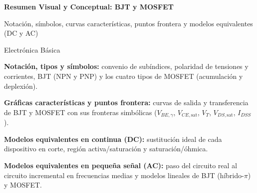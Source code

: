 \documentclass[11pt,a4paper]{article}
\begin{document}
	\begin{tcolorbox}[
		enhanced, colback=mainblue, colframe=mainblue, arc=4pt,
		left=14pt, right=14pt, top=14pt, bottom=14pt, boxrule=0pt,
		borderline south={3pt}{0pt}{goldline}
		]
		\centering\color{white}
		{\Huge\bfseries Resumen Visual y Conceptual: BJT y MOSFET\par}
		\vspace{0.5em}
		{\Large Notación, símbolos, curvas características, puntos frontera y modelos equivalentes (DC y AC)\par}
		\vspace{0.7em}
		{\normalsize Electrónica Básica \par}
	\end{tcolorbox}

	\vspace{1.0em}

	\begin{tcolorbox}[notebox, title={Cómo está organizado este resumen}, top=12pt]
		\begin{description}[leftmargin=!, labelwidth=2.6cm, itemsep=0.35em]
			\item[Sección 1] \textbf{Notación, tipos y símbolos:} convenio de subíndices, polaridad de tensiones y corrientes, BJT (NPN y PNP) y los cuatro tipos de MOSFET (acumulación y deplexión).
			\item[Sección 2] \textbf{Gráficas características y puntos frontera:} curvas de salida y transferencia de BJT y MOSFET con sus fronteras simbólicas ($V_{BE,\gamma}$, $V_{CE,\mathrm{sat}}$, $V_T$, $V_{DS,\mathrm{sat}}$, $I_{DSS}$).
			\item[Sección 3] \textbf{Modelos equivalentes en continua (DC):} sustitución ideal de cada dispositivo en corte, región activa/saturación y saturación/óhmica.
			\item[Sección 4] \textbf{Modelos equivalentes en pequeña señal (AC):} paso del circuito real al circuito incremental en frecuencias medias y modelos lineales de BJT (híbrido-$\pi$) y MOSFET.
		\end{description}
	\end{tcolorbox}

	\vspace{0.6em}
\end{document}
